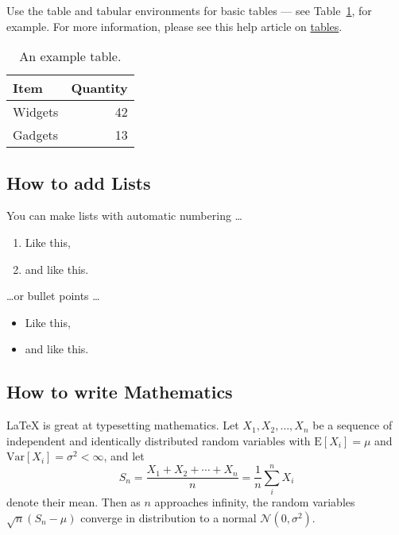 \documentclass[12pt,a4paper,faculty=eb,language=en]{ugent-doc}
\begin{document}
Use the table and tabular environments for basic tables --- see Table~\ref{tab:widgets}, for example. For more information, please see this help article on \href{https://www.overleaf.com/learn/latex/tables}{tables}. 

\begin{table}[h]
\centering
    \begin{tabular}{l|r}
        Item & Quantity \\\hline
        Widgets & 42 \\
        Gadgets & 13
    \end{tabular}
    \caption{\label{tab:widgets}An example table.}
\end{table}


\subsection{How to add Lists}

You can make lists with automatic numbering \dots

\begin{enumerate}
    \item Like this,
    \item and like this.
\end{enumerate}
\dots or bullet points \dots
\begin{itemize}
    \item Like this,
    \item and like this.
\end{itemize}


\subsection{How to write Mathematics}

\LaTeX{} is great at typesetting mathematics. Let $X_1, X_2, \ldots, X_n$ be a sequence of independent and identically distributed random variables with $\text{E}[X_i] = \mu$ and $\text{Var}[X_i] = \sigma^2 < \infty$, and let
\[S_n = \frac{X_1 + X_2 + \cdots + X_n}{n}
      = \frac{1}{n}\sum_{i}^{n} X_i\]
denote their mean. Then as $n$ approaches infinity, the random variables $\sqrt{n}(S_n - \mu)$ converge in distribution to a normal $\mathcal{N}(0, \sigma^2)$.

\end{document}
